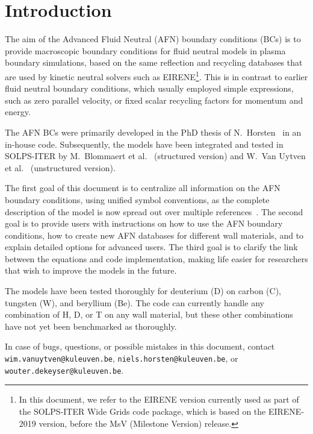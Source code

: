 \chapter{Introduction}

The aim of the Advanced Fluid Neutral (AFN) boundary conditions (BCs) is to provide macroscopic boundary conditions for fluid neutral models in plasma boundary simulations, based on the same reflection and recycling databases that are used by kinetic neutral solvers such as EIRENE\footnote{In this document, we refer to the EIRENE version currently used as part of the SOLPS-ITER Wide Grids code package, which is based on the EIRENE-2019 version, before the MsV (Milestone Version) release.}. This is in contrast to earlier fluid neutral boundary conditions, which usually employed simple expressions, such as zero parallel velocity, or fixed scalar recycling factors for momentum and energy.

The AFN BCs were primarily developed in the PhD thesis of N.~Horsten~\cite{phd_niels} in an in-house code. Subsequently, the models have been integrated and tested in SOLPS-ITER by M.~Blommaert et al.~\cite{pet_maarten} (structured version) and W.~Van Uytven et al.~\cite{wim2022} (unstructured version).

The first goal of this document is to centralize all information on the AFN boundary conditions, using unified symbol conventions, as the complete description of the model is now spread out over multiple references~\cite{nf_niels,phd_niels,phd_wim,nf_wim,pet_maarten,psi_niels}.
The second goal is to provide users with instructions on how to use the AFN boundary conditions, how to create new AFN databases for different wall materials, and to explain detailed options for advanced users.
The third goal is to clarify the link between the equations and code implementation, making life easier for researchers that wish to improve the models in the future.

The models have been tested thoroughly for deuterium (D) on carbon (C), tungsten (W), and beryllium (Be). The code can currently handle any combination of H, D, or T on any wall material, but these other combinations have not yet been benchmarked as thoroughly.

In case of bugs, questions, or possible mistakes in this document, contact \texttt{wim.vanuytven@kuleuven.be}, \texttt{niels.horsten@kuleuven.be}, or \texttt{wouter.dekeyser@kuleuven.be}.
